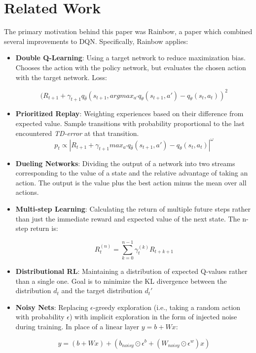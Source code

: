 \documentclass[letterpaper]{article}
\begin{document}
	 
	
	\section{Related Work}
	
	The primary motivation behind this paper was Rainbow, a paper which combined several improvements to DQN\cite{hessel2017rainbow}. Specifically, Rainbow applies:
	\begin{itemize}
		\item \textbf{Double Q-Learning}: Using a target network to reduce maximization bias\cite{hasselt2010double}. Chooses the action with the policy network, but evaluates the chosen action with the target network. Loss:
		
		\begin{equation}
			(R_{t+1}+\gamma_{t+1}q_{\widehat{\theta}}(s_{t+1}, argmax_{a'}q_{\theta}(s_{t+1}, a')-q_{\theta}(s_t, a_t))^2
		\end{equation}
	
		\item \textbf{Prioritized Replay}: Weighting experiences based on their difference from expected value\cite{schaul2015prioritized}. Sample transitions with probability proportional to the last encountered \textit{TD-error} at that transition.
		\begin{equation}
			p_t \propto |R_{t+1} + \gamma_{t+1}max_{a'}q_{\widehat{\theta}}(s_{t+1}, a')-q_{\theta}(s_t, a_t)|^\omega
		\end{equation}
		\item \textbf{Dueling Networks}: Dividing the output of a network into two streams corresponding to the value of a state and the relative advantage of taking an action\cite{wang2015dueling}. The output is the value plus the best action minus the mean over all actions.
		
		\item \textbf{Multi-step Learning}: Calculating the return of multiple future steps rather than just the immediate reward and expected value of the next state\cite{sutton2018reinforcement}. The n-step return is:
		
		\begin{equation}
			R_t^{(n)}=\sum_{k=0}^{n-1}\gamma_t^{(k)}R_{t+k+1}
		\end{equation}
		
		
		\item \textbf{Distributional RL}: Maintaining a distribution of expected Q-values rather than a single one\cite{bellemare2017distributional}. Goal is to minimize the  KL divergence between the distribution $d_t$ and the target distribution $d_t'$
		
		\item \textbf{Noisy Nets}: Replacing $\epsilon$-greedy exploration (i.e., taking a random action with probability $\epsilon$) with implicit exploration in the form of injected noise during training\cite{fortunato2017noisy}. In place of a linear layer $y=b + Wx$: 
		
		\begin{equation}
			y = (b+Wx)+(b_{noisy} \odot \epsilon^b + (W_{noisy}\odot \epsilon^w)x)
		\end{equation}
	\end{itemize}
\end{document}
